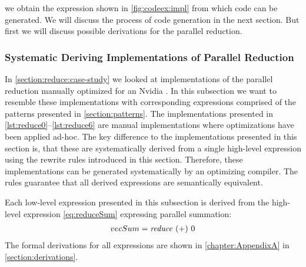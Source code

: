  we obtain the expression shown in \autoref{fig:codeex:impl} from which \OpenCL code can be generated.
We will discuss the process of \OpenCL code generation in the next section.
But first we will discuss possible derivations for the parallel reduction.












\subsubsection{Systematic Deriving Implementations of Parallel Reduction}

In \autoref{section:reduce:case-study} we looked at implementations of the parallel reduction manually optimized for an Nvidia \GPU.
In this subsection we want to resemble these implementations with corresponding expressions comprised of the patterns presented in \autoref{section:patterns}.
The implementations presented in \autoref{lst:reduce0}--\autoref{lst:reduce6} are manual implementations where optimizations have been applied ad-hoc.
The key difference to the implementations presented in this section is, that these are systematically derived from a single high-level expression using the rewrite rules introduced in this section.
Therefore, these implementations can be generated systematically by an optimizing compiler.
The rules guarantee that all derived expressions are semantically equivalent.

Each \OpenCL low-level expression presented in this subsection is derived from the high-level expression \autoref{eq:reduceSum} expressing parallel summation:
\begin{align}
  vecSum = \text{\textit{reduce}}\ (+)\ 0
  \label{eq:reduceSum}
\end{align}
%
The formal derivations for all expressions are shown in \autoref{chapter:AppendixA} in \autoref{section:derivations}.


